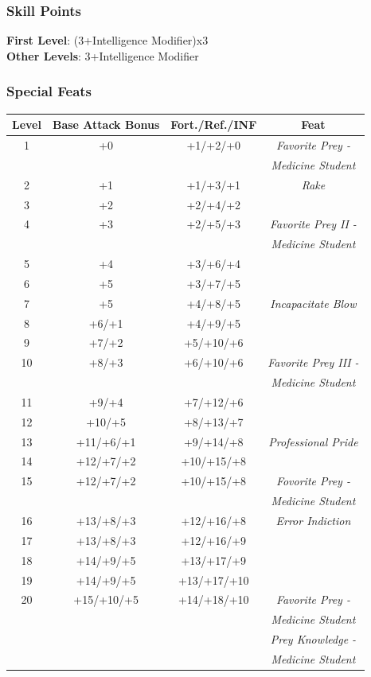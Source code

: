 \documentclass[ letterpaper,12pt]{article}
\begin{document}
{\subsubsection{Skill Points}
{\bf First Level}: (3+Intelligence Modifier)x3\\
{\bf Other Levels}: 3+Intelligence Modifier\\

\subsubsection{Special Feats}

\begin{center} \begin{tabular}{|c||c|c|c|}
\hline
{\bf Level}&{\bf Base Attack Bonus}&{\bf Fort./Ref./INF}&{\bf Feat}\\
\hline
1&+0&+1/+2/+0&{\it Favorite Prey -}\\
&&&{\it Medicine Student}\\
\hline
2&+1&+1/+3/+1&{\it Rake}\\
\hline
3&+2&+2/+4/+2&\\
\hline
4&+3&+2/+5/+3&{\it Favorite Prey II -}\\
&&&{\it Medicine Student}\\
\hline
5&+4&+3/+6/+4&\\
\hline
6&+5&+3/+7/+5&\\
\hline
7&+5&+4/+8/+5&{\it Incapacitate Blow}\\
\hline
8&+6/+1&+4/+9/+5&\\
\hline
9&+7/+2&+5/+10/+6&\\
\hline
10&+8/+3&+6/+10/+6&{\it Favorite Prey III -}\\
&&&{\it Medicine Student}\\
\hline
11&+9/+4&+7/+12/+6&\\
\hline
12&+10/+5&+8/+13/+7&\\
\hline
13&+11/+6/+1&+9/+14/+8&{\it Professional Pride}\\
\hline
14&+12/+7/+2&+10/+15/+8&\\
\hline
15&+12/+7/+2&+10/+15/+8&{\it Fovorite Prey -}\\
&&&{\it Medicine Student}\\
\hline
16&+13/+8/+3&+12/+16/+8&{\it Error Indiction}\\
\hline
17&+13/+8/+3&+12/+16/+9&\\
\hline
18&+14/+9/+5&+13/+17/+9&\\
\hline
19&+14/+9/+5&+13/+17/+10&\\
\hline
20&+15/+10/+5&+14/+18/+10&{\it Favorite Prey -}\\
&&&{\it Medicine Student}\\
&&&{\it Prey Knowledge - }\\
&&&{\it Medicine Student}\\
\hline
\end{tabular} \end{center}

}
\end{document}
